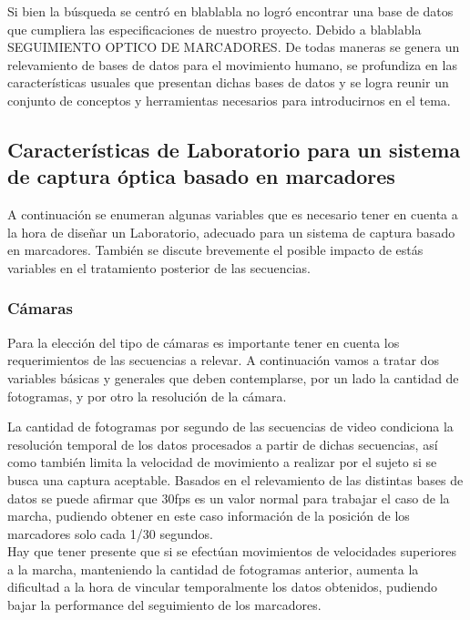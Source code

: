 Si bien la búsqueda se centró en blablabla no logró encontrar una base de datos que cumpliera las especificaciones de nuestro proyecto. Debido a blablabla SEGUIMIENTO OPTICO DE MARCADORES.
 De todas maneras se genera un relevamiento de bases de datos para el movimiento humano, se profundiza en las características usuales que presentan dichas bases de datos y se logra reunir un conjunto de conceptos y herramientas necesarios para introducirnos en el tema. 



\subsection{Características de Laboratorio para un sistema de captura óptica basado en marcadores}

 
A continuación se enumeran algunas variables que es necesario tener en cuenta a la hora de diseñar un Laboratorio, adecuado para un sistema de captura basado en marcadores. También se discute brevemente el posible impacto de estás variables en el tratamiento posterior de las secuencias.

\subsubsection{Cámaras}\label{parrafo_Camaras} 
Para la elección del tipo de cámaras es importante tener en cuenta los requerimientos de las secuencias a relevar. A continuación vamos a tratar dos variables básicas y generales que deben contemplarse, por un lado la cantidad de fotogramas, y por otro la resolución de la cámara.

La cantidad de fotogramas por segundo de las secuencias de video condiciona la resolución temporal de los datos procesados a partir de dichas secuencias, así como también limita la velocidad de movimiento a realizar por el sujeto si se busca una captura aceptable.
Basados en el relevamiento de las distintas bases de datos se puede afirmar que 30fps es un valor normal para trabajar el caso de la marcha, pudiendo obtener en este caso información de la posición de los marcadores solo cada 1/30 segundos.\\ 
Hay que tener presente que si se efectúan movimientos de velocidades superiores a la marcha, manteniendo la cantidad de fotogramas anterior, aumenta la dificultad a la hora de vincular temporalmente los datos obtenidos, pudiendo bajar la performance del seguimiento de los marcadores. 


